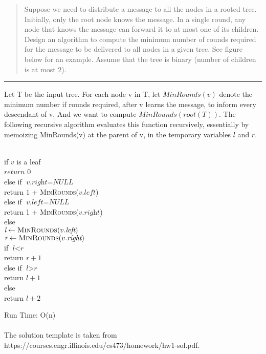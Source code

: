 \documentclass[11pt]{article}
\begin{document}



\begin{quote}

\begin{enumerate}
	Suppose we need to distribute a message to all the nodes in a
	rooted tree. Initially, only the root node knows the message. In a
	single round, any node that knows the message can forward it to at
	most one of its children. Design an algorithm to compute the minimum
	number of rounds required for the message to be delivered to all
	nodes in a given tree.   See figure below for an example. 
	Assume that the tree is binary (number of children is at most $2$).
\end{enumerate}

\end{quote}
\hrule

\begin{solution}
	\mbox{}
Let T be the input tree. For each node v in T, let $MinRounds(v)$ denote the minimum number if rounds required, after v learns the message, to inform every descendant of v. And we want to compute $MinRounds(root(T))$. The following recursive algorithm evaluates this function recursively, essentially by memoizing MinRounds(v) at the parent of v, in the temporary variables $l$ and $r$.
\begin{center}
	\begin{algorithm}			
		\+
		\\ if $\textit{v}$ is a leaf \+
		\\  	$\textit{return}$ $0$\-
		\\ else if $\textit{v.right} = \textit{NULL}$ \+
		\\ 		return $1$ + \textsc{MinRounds}($\textit{v.left}$)\-
		\\ else if $\textit{v.left} = \textit{NULL}$ \+
		\\ 		return 1 + \textsc{MinRounds}($\textit{v.right}$)\-
		\\ else \+
		\\ $\textit{l} \gets \textsc{MinRounds}(v.\textit{left})$
		\\ $\textit{r} \gets \textsc{MinRounds}(v.\textit{right})$
		\\ if $\textit{l} < \textit{r}$\+
		\\ 		return $r+1$\-
		\\ else if $\textit{l} > \textit{r}$\+
		\\ 		return $l+1$\-
		\\ else\+
		\\ 		return $l+2$\-
	\end{algorithm}
\end{center}
Run Time: O(n)\\

\paragraph{} The solution template is taken from https://courses.engr.illinois.edu/cs473/homework/hw1-sol.pdf.

\end{solution}
\end{document}
